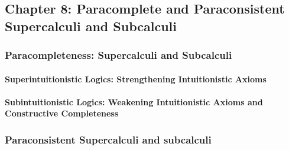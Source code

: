 \hypertarget{chapter-8-paracomplete-and-paraconsistent-supercalculi-and-subcalculi}{%
\subsection*{Chapter 8: Paracomplete and Paraconsistent Supercalculi and
Subcalculi}\label{chapter-8-paracomplete-and-paraconsistent-supercalculi-and-subcalculi}}

\hypertarget{paracompleteness-supercalculi-and-subcalculi}{%
\subsubsection*{Paracompleteness: Supercalculi and
Subcalculi}\label{paracompleteness-supercalculi-and-subcalculi}}

\hypertarget{superintuitionistic-logics-strengthening-intuitionistic-axioms}{%
\paragraph*{Superintuitionistic Logics: Strengthening Intuitionistic
Axioms}\label{superintuitionistic-logics-strengthening-intuitionistic-axioms}}

\hypertarget{subintuitionistic-logics-weakening-intuitionistic-axioms-and-constructive-completeness}{%
\paragraph*{Subintuitionistic Logics: Weakening Intuitionistic Axioms
and Constructive
Completeness}\label{subintuitionistic-logics-weakening-intuitionistic-axioms-and-constructive-completeness}}

\hypertarget{paraconsistent-supercalculi-and-subcalculi}{%
\subsubsection*{Paraconsistent Supercalculi and
subcalculi}\label{paraconsistent-supercalculi-and-subcalculi}}

